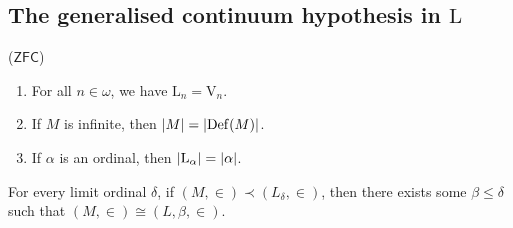 \subsection{The generalised continuum hypothesis in \texorpdfstring{\( \mathrm{L} \)}{L}}
\begin{lemma}
    (\( \mathsf{ZFC} \))
    \begin{enumerate}
        \item For all \( n \in \omega \), we have \( \mathrm{L}_n = \mathrm{V}_n \).
        \item If \( M \) is infinite, then \( \abs{M} = \abs{\operatorname{Def}(M)} \).
        \item If \( \alpha \) is an ordinal, then \( \abs{\mathrm{L}_\alpha} = \abs{\alpha} \).
    \end{enumerate}
\end{lemma}
\begin{lemma}
    For every limit ordinal \( \delta \), if \( (M, \in) \prec (L_\delta, \in) \), then there exists some \( \beta \leq \delta \) such that \( (M, \in) \cong (L,\beta, \in) \).
\end{lemma}
